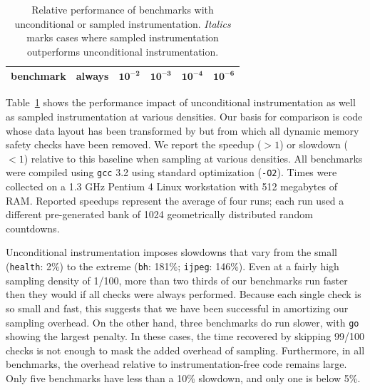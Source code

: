 \begin{table}
  \centering
  \begin{tabular}{|l|r|rrrr|}
    \hline
    \rule{0pt}{2.5ex}
    \textbf{benchmark} & \textbf{always} & $\mathbf{10^{-2}}$ & $\mathbf{10^{-3}}$ & $\mathbf{10^{-4}}$ & $\mathbf{10^{-6}}$ \\
    \hline\hline
    
  \end{tabular}
  \caption{Relative performance of \CCured benchmarks with
    unconditional or sampled instrumentation.  \textit{Italics} marks
    cases where sampled instrumentation outperforms unconditional
    instrumentation.}
  \label{tab:share:density}
\end{table}

Table~\ref{tab:share:density} shows the performance impact of
unconditional instrumentation as well as sampled instrumentation at
various densities.  Our basis for comparison is code whose data layout
has been transformed by \CCured but from which all dynamic memory
safety checks have been removed.  We report the speedup ($>1$) or
slowdown ($<1$) relative to this baseline when sampling at various
densities.  All benchmarks were compiled using \texttt{gcc} 3.2 using
standard optimization (\texttt{-O2}).  Times were collected on a 1.3
GHz Pentium 4 Linux workstation with 512 megabytes of RAM\@.  Reported
speedups represent the average of four runs; each run used a different
pre-generated bank of 1024 geometrically distributed random
countdowns.

Unconditional instrumentation imposes slowdowns that vary from the
small (\texttt{health}: 2\%) to the extreme (\texttt{bh}: 181\%;
\texttt{ijpeg}: 146\%).  Even at a fairly high sampling density of
1/100, more than two thirds of our benchmarks run faster then they
would if all checks were always performed.  Because each single check
is so small and fast, this suggests that we have been successful in
amortizing our sampling overhead.  On the other hand, three benchmarks
do run slower, with \texttt{go} showing the largest penalty.  In these
cases, the time recovered by skipping 99/100 checks is not enough to
mask the added overhead of sampling.  Furthermore, in all benchmarks,
the overhead relative to instrumentation-free code remains large.
Only five benchmarks have less than a 10\% slowdown, and only one is
below 5\%.

